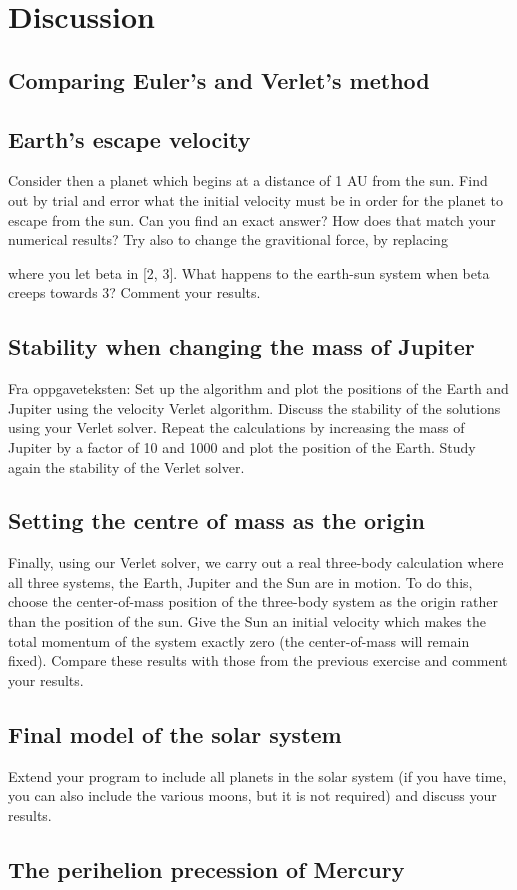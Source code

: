\section{Discussion}
\label{sec:discussion}

\subsection{Comparing Euler's and Verlet's method}

\subsection{Earth's escape velocity}
Consider then a planet which begins at a
distance of 1 AU from the sun. Find out by trial and error what the initial
velocity must be in order for the planet to escape from the sun. Can you find an
exact answer? How does that match your numerical results?
Try also to change the gravitional force, by replacing

where you let beta in [2, 3]. What happens to the earth-sun system when beta creeps
towards 3? Comment your results.


\subsection{Stability when changing the mass of Jupiter}
Fra oppgaveteksten: Set up the algorithm and plot the positions of
the Earth and Jupiter using the velocity Verlet algorithm. Discuss the stability
of the solutions using your Verlet solver.
Repeat the calculations by increasing the mass of Jupiter by a factor of 10
and 1000 and plot the position of the Earth. Study again the stability of the
Verlet solver.

\subsection{Setting the centre of mass as the origin}
Finally,
using our Verlet solver, we carry out a real three-body calculation where all
three systems, the Earth, Jupiter and the Sun are in motion. To do this, choose
the center-of-mass position of the three-body system as the origin rather than
the position of the sun. Give the Sun an initial velocity which makes the total
momentum of the system exactly zero (the center-of-mass will remain fixed).
Compare these results with those from the previous exercise and comment your
results.

\subsection{Final model of the solar system}
Extend your program to include all planets in the solar system (if you
have time, you can also include the various moons, but it is not required) and
discuss your results.


\subsection{The perihelion precession of Mercury}
